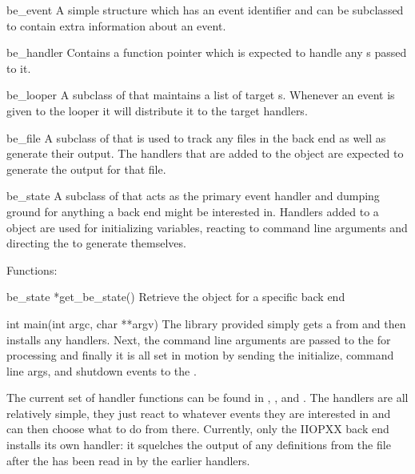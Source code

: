 \begin{ctypelist}
  \item[be_event] A simple structure which has an event identifier and
  can be subclassed to contain extra information about an event.

  \item[be_handler] Contains a function pointer which is expected to
  handle any s passed to it.

  \item[be_looper] A subclass of  that maintains a
  list of target s.  Whenever an event is given to the looper
  it will distribute it to the target handlers.

  \item[be_file] A subclass of  that is used to track
  any files in the back end as well as generate their output.  The handlers
  that are added to the  object are expected to generate the
  output for that file.

  \item[be_state] A subclass of  that acts as the
  primary event handler and dumping ground for anything a back end might be
  interested in.  Handlers added to a  object are used for
  initializing variables, reacting to command line arguments and directing
  the  to generate themselves.
\end{ctypelist}

Functions:

\begin{cprototypelist}
  \item[be_state *get_be_state()] Retrieve the 
  object for a specific back end

  \item[int main(int argc, char **argv)] The library provided
   simply gets a  from
   and then installs any handlers.  Next, the command
  line arguments are passed to the  for processing and finally
  it is all set in motion by sending the initialize, command line args, and
  shutdown events to the .
\end{cprototypelist}

The current set of handler functions can be found in
, ,
and .  The handlers are all relatively
simple, they just react to whatever events they are interested in and can then
choose what to do from there.  Currently, only the IIOPXX back end installs its
own handler: it squelches the output of any definitions from the
 file after the \PRES{} has been read in by the earlier
handlers.

